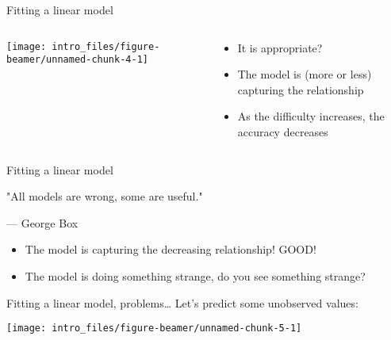 \documentclass[
  ignorenonframetext,
]{beamer}
\providecommand{\tightlist}{%
  \setlength{\itemsep}{0pt}\setlength{\parskip}{0pt}}
\begin{document}
\begin{frame}{Fitting a linear model}
\protect\hypertarget{fitting-a-linear-model-1}{}
\begin{columns}
\begin{column}{0.3\textwidth}


\begin{center}\texttt{[image: intro\_files/figure-beamer/unnamed-chunk-4-1]} \end{center}

\end{column}
\begin{column}{0.7\textwidth}

\begin{itemize}
    \item It is appropriate?
    \item The model is (more or less) capturing the relationship
    \item As the difficulty increases, the accuracy decreases
\end{itemize}

\end{column}
\end{columns}
\end{frame}

\begin{frame}{Fitting a linear model}
\protect\hypertarget{fitting-a-linear-model-2}{}
\begin{displayquote}
"All models are wrong, some are useful."

\hfill --- George Box
\end{displayquote}

\begin{itemize}
\tightlist
\item
  The model is capturing the decreasing relationship! GOOD!
\item
  The model is doing something strange, do you see something strange?
\end{itemize}
\end{frame}

\begin{frame}{Fitting a linear model, problems\ldots{}}
\protect\hypertarget{fitting-a-linear-model-problems}{}
Let's predict some unobserved values:

\begin{center}\texttt{[image: intro\_files/figure-beamer/unnamed-chunk-5-1]} \end{center}
\end{frame}
\end{document}
